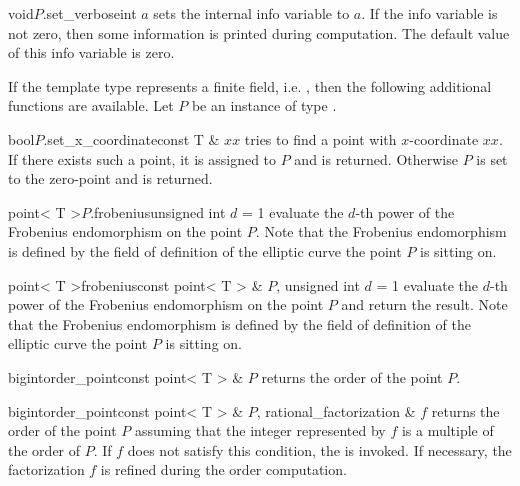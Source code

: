 
\BASIC

\begin{fcode}{void}{$P$.set_verbose}{int $a$}
  sets the internal info variable to $a$.  If the info variable is not zero, then some
  information is printed during computation.  The default value of this info variable is zero.
\end{fcode}



\HIGH

If the template type  represents a finite field, i.e. , then the
following additional functions are available.  Let $P$ be an instance of type .

\begin{fcode}{bool}{$P$.set_x_coordinate}{const T & $xx$}
  tries to find a point with $x$-coordinate $xx$.  If there exists such a point, it is assigned
  to $P$ and \TRUE is returned.  Otherwise $P$ is set to the zero-point and \FALSE is returned.
\end{fcode}

\begin{fcode}{point< T >}{$P$.frobenius}{unsigned int $d$ = 1}
  evaluate the $d$-th power of the Frobenius endomorphism on the point $P$.  Note that the
  Frobenius endomorphism is defined by the field of definition of the elliptic curve the point
  $P$ is sitting on.
\end{fcode}

\begin{fcode}{point< T >}{frobenius}{const point< T > & $P$, unsigned int $d$ = 1}
  evaluate the $d$-th power of the Frobenius endomorphism on the point $P$ and return the
  result.  Note that the Frobenius endomorphism is defined by the field of definition of the
  elliptic curve the point $P$ is sitting on.
\end{fcode}

\begin{fcode}{bigint}{order_point}{const point< T > & $P$}
  returns the order of the point $P$.
\end{fcode}

\begin{fcode}{bigint}{order_point}{const point< T > & $P$, rational_factorization & $f$}
  returns the order of the point $P$ assuming that the integer represented by $f$ is a multiple
  of the order of $P$.  If $f$ does not satisfy this condition, the \LEH is invoked.  If
  necessary, the factorization $f$ is refined during the order computation.
\end{fcode}

